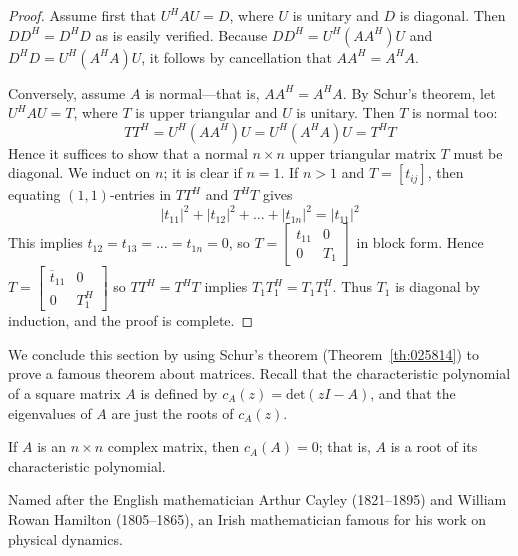 \documentclass{ximera}
\begin{document}
\begin{proof}
Assume first that $U^{H}AU = D$, where $U$ is unitary and $D$ is diagonal. Then $DD^{H} = D^{H}D$ as is easily verified. Because $DD^{H} = U^{H}(AA^{H})U$ and $D^{H}D = U^{H}(A^{H}A)U$, it follows by cancellation that $AA^{H} = A^{H}A$.

Conversely, assume $A$ is normal---that is, $AA^{H} = A^{H}A$. By Schur's theorem, let $U^{H}AU = T$, where $T$ is upper triangular and $U$ is unitary. Then $T$ is normal too:
\begin{equation*}
TT^H = U^H(AA^H)U = U^H(A^HA)U = T^HT
\end{equation*}
Hence it suffices to show that a normal $n \times n$ upper triangular matrix $T$ must be diagonal. We induct on $n$; it is clear if $n = 1$. If $n > 1$ and $T = \left[ t_{ij} \right]$, then equating $(1, 1)$-entries in $TT^{H}$ and $T^{H}T$ gives
\begin{equation*}
|t_{11}|^2 + |t_{12}|^2 + \ldots + |t_{1n}|^2 = |t_{11}|^2
\end{equation*}
This implies $t_{12} = t_{13} = \ldots = t_{1n} = 0$, so $T = \left[ \begin{array}{cc}
t_{11} & 0 \\
0 & T_{1}
\end{array}\right]$ in block form. Hence $T = \left[ \begin{array}{cc}
\overline{t}_{11} & 0 \\
0 & T_{1}^H
\end{array}\right]$ so $TT^{H} = T^{H}T$ implies $T_{1}T_{1}^H = T_{1}T_{1}^H$. Thus $T_{1}$ is diagonal by induction, and the proof is complete.
\end{proof}

We conclude this section by using Schur's theorem (Theorem~\ref{th:025814}) to prove a famous theorem about matrices. Recall that the characteristic polynomial of a square matrix $A$ is defined by $c_{A}(z) = \mbox{det}(zI - A)$, and that the eigenvalues of $A$ are just the roots of $c_{A}(z)$.

\begin{theorem}\label{th:Cayley_Hamilton}
If $A$ is an $n \times n$ complex matrix, then $c_{A}(A) = 0$; that is, $A$ is a root of its characteristic polynomial.
\end{theorem}

\begin{remark}
Named after the English mathematician Arthur Cayley (1821--1895) and William Rowan Hamilton (1805--1865), an Irish mathematician famous for his work on physical dynamics.
\end{remark}
\end{document}
